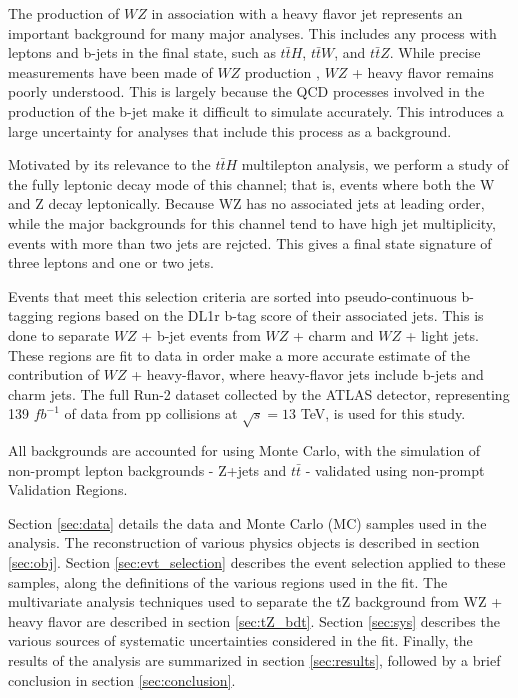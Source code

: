 
The production of $WZ$ in association with a heavy flavor jet represents an important background for many major analyses. This includes any process with leptons and b-jets in the final state, such as $t\bar{t}H$, $t\bar{t}W$, and $t\bar{t}Z$. While precise measurements have been made of $WZ$ production \cite{WZ_36}, $WZ$ + heavy flavor remains poorly understood. This is largely because the QCD processes involved in the production of the b-jet make it difficult to simulate accurately. This introduces a large uncertainty for analyses that include this process as a background.

Motivated by its relevance to the $t\bar{t}H$ multilepton analysis, we perform a study of the fully leptonic decay mode of this channel; that is, events where both the W and Z decay leptonically. Because WZ has no associated jets at leading order, while the major backgrounds for this channel tend to have high jet multiplicity, events with more than two jets are rejcted. This gives a final state signature of three leptons and one or two jets.

Events that meet this selection criteria are sorted into pseudo-continuous b-tagging regions based on the DL1r b-tag score of their associated jets. This is done to separate $WZ$ + b-jet events from $WZ$ + charm and $WZ$ + light jets. These regions are fit to data in order make a more accurate estimate of the contribution of $WZ$ + heavy-flavor, where heavy-flavor jets include b-jets and charm jets. The full Run-2 dataset collected by the ATLAS detector, representing 139 $fb^{-1}$ of data from pp collisions at $\sqrt{s} = 13$ TeV, is used for this study.

All backgrounds are accounted for using Monte Carlo, with the simulation of non-prompt lepton backgrounds - Z+jets and $t\bar{t}$ - validated using non-prompt Validation Regions.

Section \ref{sec:data} details the data and Monte Carlo (MC) samples used in the analysis. The reconstruction of various physics objects is described in section \ref{sec:obj}. Section \ref{sec:evt_selection} describes the event selection applied to these samples, along the definitions of the various regions used in the fit. The multivariate analysis techniques used to separate the tZ background from WZ + heavy flavor are described in section \ref{sec:tZ_bdt}. Section \ref{sec:sys} describes the various sources of systematic uncertainties considered in the fit. Finally, the results of the analysis are summarized in section \ref{sec:results}, followed by a brief conclusion in section \ref{sec:conclusion}.

